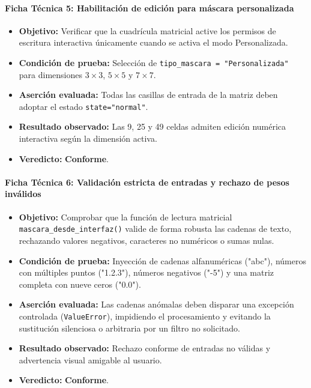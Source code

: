 \documentclass[11pt]{article}
\newcommand{\pruebaok}{\textcolor{verdeExito}{\textbf{Conforme}}}
\begin{document}
\paragraph{Ficha Técnica 5: Habilitación de edición para máscara personalizada}
\begin{itemize}[itemsep=0.15em]
\item \textbf{Objetivo:} Verificar que la cuadrícula matricial active los permisos de escritura interactiva únicamente cuando se activa el modo Personalizada.
\item \textbf{Condición de prueba:} Selección de \texttt{tipo\_mascara = "Personalizada"} para dimensiones $3\times3$, $5\times5$ y $7\times7$.
\item \textbf{Aserción evaluada:} Todas las casillas de entrada de la matriz deben adoptar el estado \texttt{state="normal"}.
\item \textbf{Resultado observado:} Las 9, 25 y 49 celdas admiten edición numérica interactiva según la dimensión activa.
\item \textbf{Veredicto:} \pruebaok.
\end{itemize}

\paragraph{Ficha Técnica 6: Validación estricta de entradas y rechazo de pesos inválidos}
\begin{itemize}[itemsep=0.15em]
\item \textbf{Objetivo:} Comprobar que la función de lectura matricial \texttt{mascara\_desde\_interfaz()} valide de forma robusta las cadenas de texto, rechazando valores negativos, caracteres no numéricos o sumas nulas.
\item \textbf{Condición de prueba:} Inyección de cadenas alfanuméricas ("abc"), números con múltiples puntos ("1.2.3"), números negativos ("-5") y una matriz completa con nueve ceros ("0.0").
\item \textbf{Aserción evaluada:} Las cadenas anómalas deben disparar una excepción controlada (\texttt{ValueError}), impidiendo el procesamiento y evitando la sustitución silenciosa o arbitraria por un filtro no solicitado.
\item \textbf{Resultado observado:} Rechazo conforme de entradas no válidas y advertencia visual amigable al usuario.
\item \textbf{Veredicto:} \pruebaok.
\end{itemize}
\end{document}
